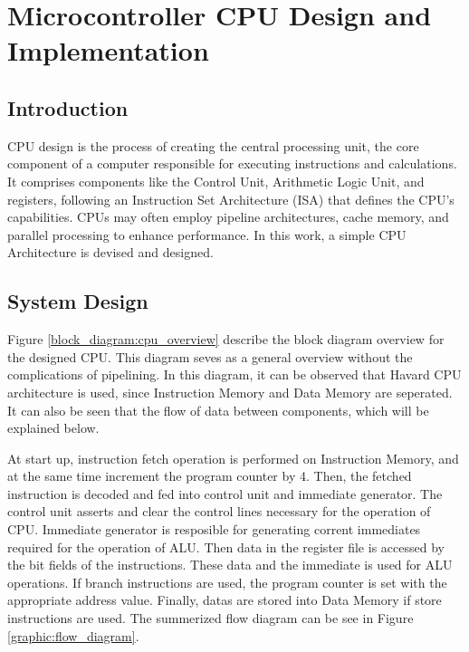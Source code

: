 \chapter{Microcontroller CPU Design and Implementation}

\section{Introduction}
CPU design is the process of creating the central processing unit, the core component of a computer responsible for executing instructions and calculations.
It comprises components like the Control Unit, Arithmetic Logic Unit, and registers, following an Instruction Set Architecture (ISA) that defines the CPU's capabilities.
CPUs may often employ pipeline architectures, cache memory, and parallel processing to enhance performance.
In this work, a simple CPU Architecture is devised and designed.

\section{System Design}
Figure \ref{block_diagram:cpu_overview} describe the block diagram overview for the designed CPU. This diagram seves as a general overview without the complications
of pipelining. In this diagram, it can be observed that Havard CPU architecture is used, since Instruction Memory and Data Memory are seperated.
It can also be seen that the flow of data between components, which will be explained below.


At start up, instruction fetch operation is performed on Instruction Memory, and at the same time
increment the program counter by 4. Then, the fetched instruction is decoded and fed into control unit and immediate generator.
The control unit asserts and clear the control lines necessary for the operation of CPU.
Immediate generator is resposible for generating corrent immediates required for the operation of ALU.
Then data in the register file is accessed by the bit fields of the instructions. These data and the immediate
is used for ALU operations. If branch instructions are used, the program counter is set with the appropriate address value.
Finally, datas are stored into Data Memory if store instructions are used. The summerized flow diagram can be see in
Figure \ref{graphic:flow_diagram}.


